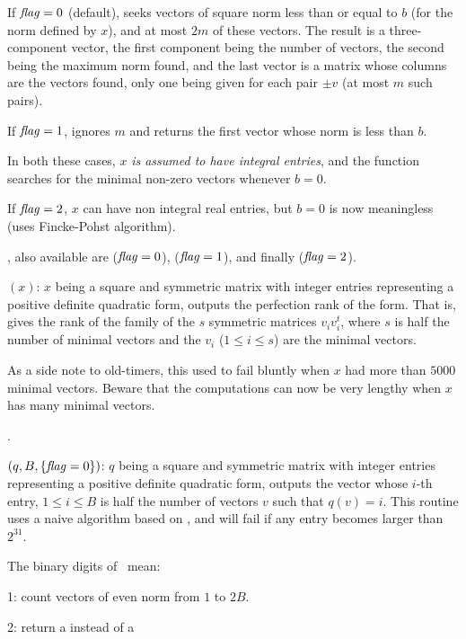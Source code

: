 If $\hbox{\it f\kern0pt lag\/}=0$ (default), seeks vectors of square norm less than or equal to $b$
(for the norm defined by $x$), and at most $2m$ of these vectors. The result
is a three-component vector, the first component being the number of vectors,
the second being the maximum norm found, and the last vector is a matrix
whose columns are the vectors found, only one being given for each
pair $\pm v$ (at most $m$ such pairs).

If $\hbox{\it f\kern0pt lag\/}=1$, ignores $m$ and returns the first vector whose norm is less than
$b$.

In both these cases, $x$ \emph{is assumed to have integral entries}, and the
function searches for the minimal non-zero vectors whenever $b=0$.

If $\hbox{\it f\kern0pt lag\/}=2$, $x$ can have non integral real entries, but $b=0$ is now
meaningless (uses Fincke-Pohst algorithm).

, also available are 
($\hbox{\it f\kern0pt lag\/}=0$),  ($\hbox{\it f\kern0pt lag\/}=1$), and finally
 ($\hbox{\it f\kern0pt lag\/}=2$).

$(x)$: $x$ being a square and symmetric matrix with
integer entries representing a positive definite quadratic form, outputs the
perfection rank of the form. That is, gives the rank of the family of the $s$
symmetric matrices $v_iv_i^t$, where $s$ is half the number of minimal
vectors and the $v_i$ ($1\le i\le s$) are the minimal vectors.

As a side note to old-timers, this used to fail bluntly when $x$ had more
than $5000$ minimal vectors. Beware that the computations can now be very
lengthy when $x$ has many minimal vectors.

.

$(q, B, \{\hbox{\it f\kern0pt lag\/} = 0\})$: $q$ being a square and symmetric
matrix with integer entries representing a positive definite quadratic form,
outputs the vector whose $i$-th entry, $1 \leq i \leq B$ is half the number
of vectors $v$ such that $q(v) = i$. This routine uses a naive algorithm
based on , and will fail if any entry becomes larger than
$2^{31}$.

\noindent The binary digits of \fl\ mean:

\item 1: count vectors of even norm from $1$ to $2B$.

\item 2: return a  instead of a 

